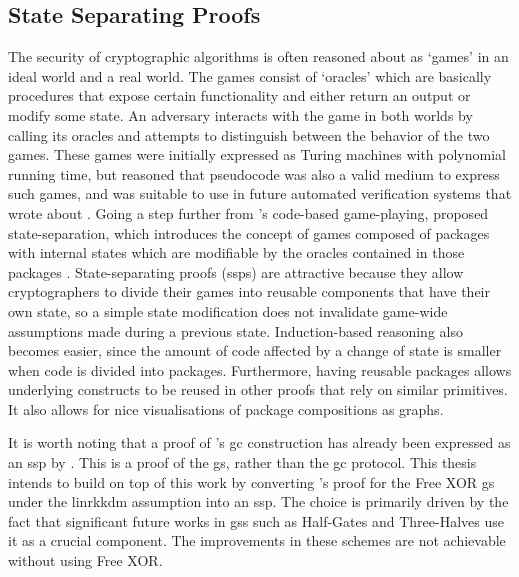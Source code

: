 \subsection{State Separating Proofs}
The security of cryptographic algorithms is often reasoned about as `games' in an ideal world and a real world. The games consist of `oracles' which are basically procedures that expose certain functionality and either return an output or modify some state. An adversary interacts with the game in both worlds by calling its oracles and attempts to distinguish between the behavior of the two games. These games were initially expressed as Turing machines with polynomial running time, but \citeauthor{EC:BelRog06} reasoned that pseudocode was also a valid medium to express such games, and was suitable to use in future automated verification systems that \citeauthor{EPRINT:Halevi05b} wrote about \cite{EC:BelRog06}. Going a step further from \citeauthor{EC:BelRog06}'s code-based game-playing, \citeauthor{brzuska_state_2018} proposed state-separation, which introduces the concept of games composed of packages with internal states which are modifiable by the oracles contained in those packages \cite{brzuska_state_2018}. State-separating proofs (\acrshort{ssp}s) are attractive because they allow cryptographers to divide their games into reusable components that have their own state, so a simple state modification does not invalidate game-wide assumptions made during a previous state. Induction-based reasoning also becomes easier, since the amount of code affected by a change of state is smaller when code is divided into packages. Furthermore, having reusable packages allows underlying constructs to be reused in other proofs that rely on similar primitives. It also allows for nice visualisations of package compositions as graphs.

It is worth noting that a proof of \citeauthor{FOCS:Yao86}'s \acrlong{gc} construction has already been expressed as an \acrshort{ssp} by \citeauthor{CSF:BrzOec23} \cite{CSF:BrzOec23}. This is a proof of the \acrlong{gs}, rather than the \acrlong{gc} protocol. This thesis intends to build on top of this work by converting \citeauthor{ALP:KolSch08}'s proof for the Free XOR \acrlong{gs} under the \acrshort{linrkkdm} assumption into an \acrshort{ssp}. The choice is primarily driven by the fact that significant future works in \acrlong{gs}s such as Half-Gates \cite{EC:ZahRosEva15} and Three-Halves \cite{threehalves} use it as a crucial component. The improvements in these schemes are not achievable without using Free XOR.  


